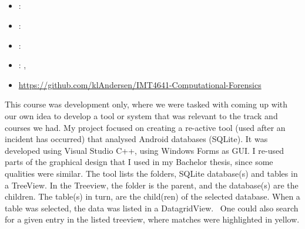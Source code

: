 \subsection[Computational Forensics]{}
\label{sec:comp_forensics}
\begin{itemize} 
	\item {}: 
	\item {}: 
	\item {}: 
	\item {}: , 
	\item {} \url{https://github.com/klAndersen/IMT4641-Computational-Forensics}
\end{itemize} 
This course was development only, where we were tasked with coming up with our own idea to develop a tool or system that was relevant to the track and courses we had.
My project focused on creating a re-active tool (used after an incident has occurred) that analysed Android databases (SQLite). 
It was developed using Visual Studio C++, using Windows Forms as GUI.
\vspace{0.5em}\newline
I re-used parts of the graphical design that I used in my Bachelor thesis, since some qualities were similar. 
The tool lists the folders, SQLite database(s) and tables in a TreeView.
In the Treeview, the folder is the parent, and the database(s) are the children. 
The table(s) in turn, are the child(ren) of the selected database. 
When a table was selected, the data was listed in a DatagridView. 
One could also search for a given entry in the listed treeview, where matches were highlighted in yellow.

